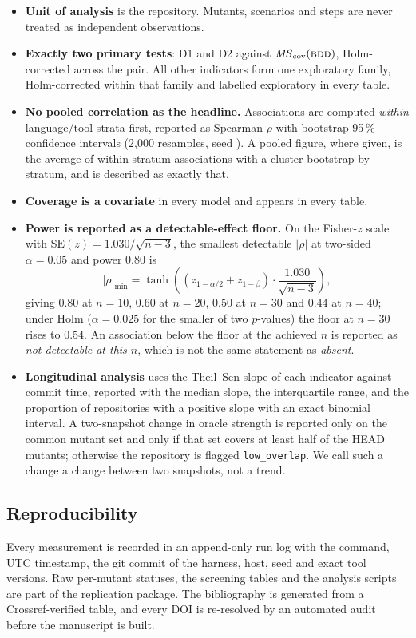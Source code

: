 \begin{itemize}
\item \textbf{Unit of analysis} is the repository. Mutants, scenarios and steps are never treated as
      independent observations.
\item \textbf{Exactly two primary tests}: D1 and D2 against $\mathit{MS}_{\mathrm{cov}}(\textsc{bdd})$, Holm-corrected across the
      pair. All other indicators form one exploratory family, Holm-corrected within that family and
      labelled exploratory in every table.
\item \textbf{No pooled correlation as the headline.} Associations are computed \emph{within}
      language/tool strata first, reported as Spearman $\rho$ with bootstrap 95\,\% confidence
      intervals (2{,}000 resamples, seed \Seed{}). A pooled figure, where given, is the average of
      within-stratum associations with a cluster bootstrap by stratum, and is described as exactly
      that.
\item \textbf{Coverage is a covariate} in every model and appears in every table.
\item \textbf{Power is reported as a detectable-effect floor.} On the Fisher-$z$ scale with
      $\mathrm{SE}(z) = 1.030/\sqrt{n-3}$, the smallest detectable $|\rho|$ at two-sided
      $\alpha = 0.05$ and power $0.80$ is
      \begin{equation}
      |\rho|_{\min} = \tanh\!\left((z_{1-\alpha/2} + z_{1-\beta})\cdot\frac{1.030}{\sqrt{n-3}}\right),
      \end{equation}
      giving $0.80$ at $n = 10$, $0.60$ at $n = 20$, $0.50$ at $n = 30$ and $0.44$ at $n = 40$; under
      Holm ($\alpha = 0.025$ for the smaller of two $p$-values) the floor at $n = 30$ rises to $0.54$.
      An association below the floor at the achieved $n$ is reported as \emph{not detectable at this
      $n$}, which is not the same statement as \emph{absent}.
\item \textbf{Longitudinal analysis} uses the Theil--Sen slope of each indicator against commit time,
      reported with the median slope, the interquartile range, and the proportion of repositories with
      a positive slope with an exact binomial interval. A two-snapshot change in oracle strength is
      reported only on the common mutant set and only if that set covers at least half of the HEAD
      mutants; otherwise the repository is flagged \texttt{low\_overlap}. We call such a change a
      change between two snapshots, not a trend.
\end{itemize}

\subsection{Reproducibility}

Every measurement is recorded in an append-only run log with the command, UTC timestamp, the git
commit of the harness, host, seed and exact tool versions. Raw per-mutant statuses, the screening
tables and the analysis scripts are part of the replication package. The bibliography is generated
from a Crossref-verified table, and every DOI is re-resolved by an automated audit before the
manuscript is built.

